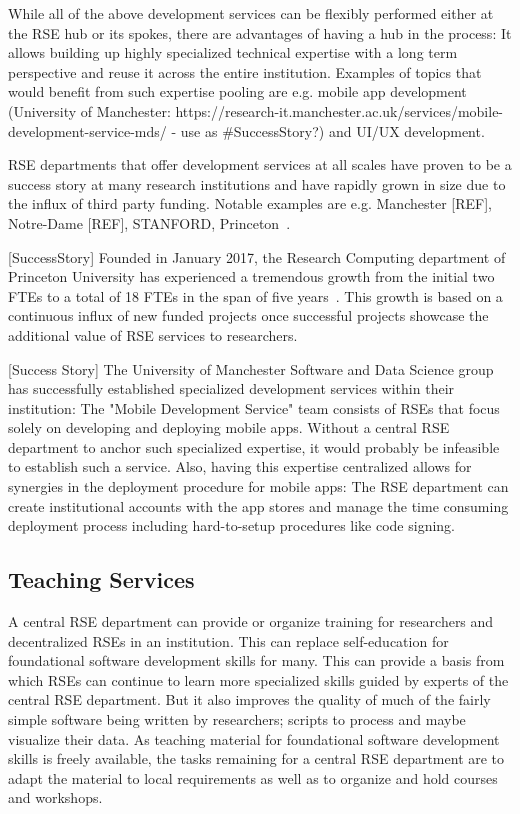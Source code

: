 \documentclass{article}
\makeatletter
\newcommand*{\eg}{e.g.\@\xspace}
\makeatother
\begin{document}
While all of the above development services can be flexibly performed either at the RSE hub or its spokes, there are advantages of having a hub in the process:
It allows building up highly specialized technical expertise with a long term perspective and reuse it across the entire institution.
Examples of topics that would benefit from such expertise pooling are \eg mobile app development (University of Manchester: https://research-it.manchester.ac.uk/services/mobile-development-service-mds/ - use as \#SuccessStory?) and UI/UX development.

RSE departments that offer development services at all scales have proven to be a success story at many research institutions and have rapidly grown in size due to the influx of third party funding.
Notable examples are \eg Manchester [REF], Notre-Dame [REF], STANFORD, Princeton~\autocite{Cosden2022}.

[SuccessStory]
Founded in January 2017, the Research Computing department of Princeton University has experienced a tremendous growth from the initial two FTEs to a total of 18 FTEs in the span of five years~\autocite{Cosden2022}.
This growth is based on a continuous influx of new funded projects once successful projects showcase the additional value of RSE services to researchers.

[Success Story]
The University of Manchester Software and Data Science group has successfully established specialized development services within their institution:
The "Mobile Development Service" \autocite{manchester_mobile} team consists of RSEs that focus solely on developing and deploying mobile apps.
Without a central RSE department to anchor such specialized expertise, it would probably be infeasible to establish such a service.
Also, having this expertise centralized allows for synergies in the deployment procedure for mobile apps:
The RSE department can create institutional accounts with the app stores and manage the time consuming deployment process including hard-to-setup procedures like code signing.

\subsection{Teaching Services}

A central RSE department can provide or organize training for researchers and decentralized RSEs in an institution.
This can replace self-education for foundational software development skills for many.
This can provide a basis from which RSEs can continue to learn more specialized skills guided by experts of the central RSE department.
But it also improves the quality of much of the fairly simple software being written by researchers; scripts to process and maybe visualize their data.
As teaching material for foundational software development skills is freely available,
the tasks remaining for a central RSE department are to adapt the material to local requirements as well as to organize and hold courses and workshops.
\end{document}

